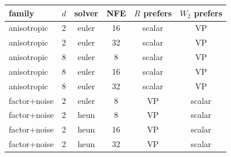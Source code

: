 \begin{tabular}{llcccc}
\toprule
family & $d$ & solver & NFE & $R$ prefers & $W_2$ prefers \\
\midrule
anisotropic & 2 & euler & 16 & scalar & VP \\
anisotropic & 2 & euler & 32 & scalar & VP \\
anisotropic & 8 & euler & 8 & scalar & VP \\
anisotropic & 8 & euler & 16 & scalar & VP \\
anisotropic & 8 & euler & 32 & scalar & VP \\
factor+noise & 2 & euler & 8 & VP & scalar \\
factor+noise & 2 & heun & 8 & VP & scalar \\
factor+noise & 2 & heun & 16 & VP & scalar \\
factor+noise & 2 & heun & 32 & VP & scalar \\
\bottomrule
\end{tabular}

